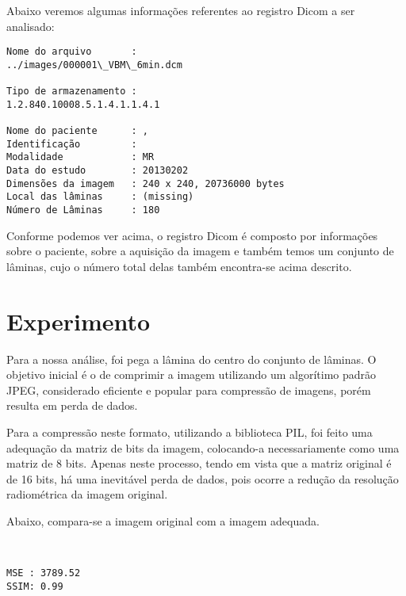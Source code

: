 \documentclass{IEEEtran}
\begin{document}
    Abaixo veremos algumas informações referentes ao registro Dicom a ser
analisado:


    \begin{Verbatim}[commandchars=\\\{\}]
Nome do arquivo       :
../images/000001\_VBM\_6min.dcm

Tipo de armazenamento :
1.2.840.10008.5.1.4.1.1.4.1

Nome do paciente      : , 
Identificação         : 
Modalidade            : MR
Data do estudo        : 20130202
Dimensões da imagem   : 240 x 240, 20736000 bytes
Local das lâminas     : (missing)
Número de Lâminas     : 180

    \end{Verbatim}

    Conforme podemos ver acima, o registro Dicom é composto por informações
sobre o paciente, sobre a aquisição da imagem e também temos um conjunto
de lâminas, cujo o número total delas também encontra-se acima descrito.

    \section{Experimento}\label{experimento}

    Para a nossa análise, foi pega a lâmina do centro do conjunto de
lâminas. O objetivo inicial é o de comprimir a imagem utilizando um
algorítimo padrão JPEG, considerado eficiente e popular para compressão
de imagens, porém resulta em perda de dados. 


    Para a compressão neste formato, utilizando a biblioteca PIL, foi feito
uma adequação da matriz de bits da imagem, colocando-a necessariamente
como uma matriz de 8 bits. Apenas neste processo, tendo em vista que a
matriz original é de 16 bits, há uma inevitável perda de dados, pois
ocorre a redução da resolução radiométrica da imagem original.

Abaixo, compara-se a imagem original com a imagem adequada.


    \begin{center}
    \end{center}
    { \hspace*{\fill} \\}
    
    \begin{Verbatim}[commandchars=\\\{\}]
MSE : 3789.52
SSIM: 0.99

    \end{Verbatim}
\end{document}
